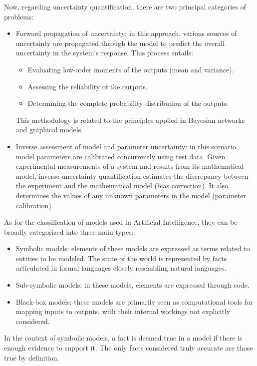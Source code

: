 \documentclass[12pt, a4paper]{report}
\begin{document}
    Now, regarding uncertainty quantification, there are two principal categories of problems:
    \begin{itemize}
        \item Forward propagation of uncertainty: in this approach, various sources of uncertainty are propagated through the model to predict the overall uncertainty in the system's response. 
            This process entails:
            \begin{itemize}
                \item Evaluating low-order moments of the outputs (mean and variance).
                \item Assessing the reliability of the outputs.
                \item Determining the complete probability distribution of the outputs. 
            \end{itemize}
            This methodology is related to the principles applied in Bayesian networks and graphical models.
        \item Inverse assessment of model and parameter uncertainty: in this scenario, model parameters are calibrated concurrently using test data. 
            Given experimental measurements of a system and results from its mathematical model, inverse uncertainty quantification estimates the discrepancy between the experiment and the mathematical model (bias correction). 
            It also determines the values of any unknown parameters in the model (parameter calibration).
    \end{itemize}
    As for the classification of models used in Artificial Intelligence, they can be broadly categorized into three main types:
    \begin{itemize}
        \item Symbolic models: elements of these models are expressed as terms related to entities to be modeled. 
            The state of the world is represented by facts articulated in formal languages closely resembling natural languages.
        \item Sub-symbolic models: in these models, elements are expressed through code.
        \item Black-box models: these models are primarily seen as computational tools for mapping inputs to outputs, with their internal workings not explicitly considered.
    \end{itemize}
    In the context of symbolic models, a fact is deemed true in a model if there is enough evidence to support it. 
    The only facts considered truly accurate are those true by definition. 
    
\end{document}
